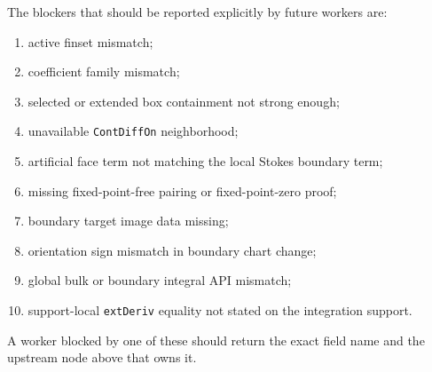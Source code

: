 \begin{remark}
  \label{obl:m7_blocker_ledger}
  The blockers that should be reported explicitly by future workers are:
  \begin{enumerate}
    \item active finset mismatch;
    \item coefficient family mismatch;
    \item selected or extended box containment not strong enough;
    \item unavailable \texttt{ContDiffOn} neighborhood;
    \item artificial face term not matching the local Stokes boundary term;
    \item missing fixed-point-free pairing or fixed-point-zero proof;
    \item boundary target image data missing;
    \item orientation sign mismatch in boundary chart change;
    \item global bulk or boundary integral API mismatch;
    \item support-local \texttt{extDeriv} equality not stated on the integration
      support.
  \end{enumerate}
  A worker blocked by one of these should return the exact field name and the
  upstream node above that owns it.
\end{remark}

\endgroup
